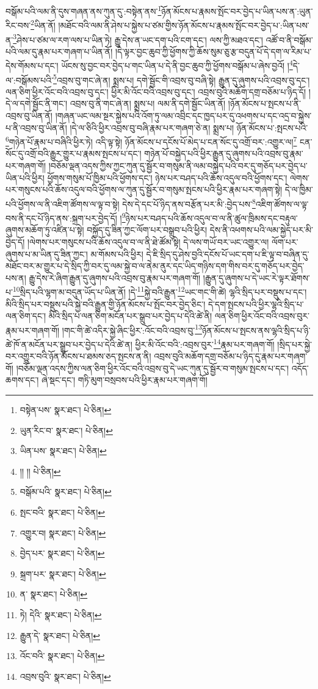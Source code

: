 བསྒོམ་པའི་ལམ་ནི་དུས་གཞན་ནས་ཀུན་དུ་:བསྟེན་ནས་\footnote{བསྟེན་པས་  སྣར་ཐང་།  པེ་ཅིན། }ཉོན་མོངས་པ་རྣམས་སྤོང་བར་བྱེད་པ་ཡིན་པས་ན་:ཡུན་རིང་བས་\footnote{ཡུན་རིང་བ་  སྣར་ཐང་།  པེ་ཅིན། }ཡིན་ནོ། །མཐོང་བའི་ལམ་ནི་ཤེས་པ་སྐྱེས་པ་ཙམ་གྱིས་ཉོན་མོངས་པ་རྣམས་སྤོང་བར་བྱེད་པ་:ཡིན་པས་ན་\footnote{ཡིན་པས་  སྣར་ཐང་།  པེ་ཅིན། }ཤེས་པ་ཙམ་ལ་རག་ལས་པ་ཡིན་ཏེ། རྒྱུ་དེས་ན་ཡང་དག་པའི་ངག་དང་། ལས་ཀྱི་མཐའ་དང་། འཚོ་བ་ནི་བསྒོམ་པའི་ལམ་དུ་རྣམ་པར་གཞག་པ་ཡིན་ནོ། །དེ་ལྟར་བྱང་ཆུབ་ཀྱི་ཕྱོགས་ཀྱི་ཆོས་སུམ་ཅུ་རྩ་བདུན་པོ་དེ་དག་ལ་རིམ་པ་དེས་གོམས་པ་དང་། ཡོངས་སུ་བྱང་བར་བྱེད་པ་གང་ཡིན་པ་དེ་ནི་བྱང་ཆུབ་ཀྱི་ཕྱོགས་བསྒོམ་པ་ཞེས་བྱའོ། །\footnote{།། །།  པེ་ཅིན། }དེ་ལ་:བསྒོམས་པའི་\footnote{བསྒོམ་པའི་  སྣར་ཐང་།  པེ་ཅིན། }འབྲས་བུ་གང་ཞེ་ན། སྨྲས་པ། དགེ་སྦྱོང་གི་འབྲས་བུ་བཞི་སྟེ། རྒྱུན་དུ་ཞུགས་པའི་འབྲས་བུ་དང་། ལན་ཅིག་ཕྱིར་འོང་བའི་འབྲས་བུ་དང་། ཕྱིར་མི་འོང་བའི་འབྲས་བུ་དང་། འབྲས་བུའི་མཆོག་དགྲ་བཅོམ་པ་ཉིད་དོ། །དེ་ལ་དགེ་སྦྱོང་ནི་གང་། འབྲས་བུ་ནི་གང་ཞེ་ན། སྨྲས་པ། ལམ་ནི་དགེ་སྦྱོང་ཡིན་ནོ། །ཉོན་མོངས་པ་སྤངས་པ་ནི་འབྲས་བུ་ཡིན་ནོ། །གཞན་ཡང་ལམ་སྔར་སྐྱེས་པའི་འོག་ཏུ་ལམ་འབྲིང་དང་ཁྱད་པར་དུ་འཕགས་པ་དང་འདྲ་བ་སྐྱེས་པ་ནི་འབྲས་བུ་ཡིན་ནོ། །དེ་ལ་ཅིའི་ཕྱིར་འབྲས་བུ་བཞི་རྣམ་པར་གཞག་ཅེ་ན། སྨྲས་པ། ཉོན་མོངས་པ་:སྤངས་པའི་\footnote{སྤང་བའི་  སྣར་ཐང་།  པེ་ཅིན། }གཉེན་པོ་རྣམ་པ་བཞིའི་ཕྱིར་ཏེ། འདི་ལྟ་སྟེ། ཉོན་མོངས་པ་དངོས་པོ་མེད་པ་ངན་སོང་དུ་འགྲོ་བར་:འགྱུར་ལ།\footnote{འགྱུར་བ།  སྣར་ཐང་།  པེ་ཅིན། } ངན་སོང་དུ་འགྲོ་བའི་རྒྱུར་གྱུར་པ་རྣམས་སྤངས་པ་དང་། གཉེན་པོ་བསྐྱེད་པའི་ཕྱིར་རྒྱུན་དུ་ཞུགས་པའི་འབྲས་བུ་རྣམ་པར་གཞག་གོ། །བཅོམ་ལྡན་འདས་ཀྱིས་ཀྱང་ཀུན་དུ་སྦྱོར་བ་གསུམ་ནི་ལམ་བསྐྱེད་པའི་བར་དུ་གཅོད་པར་བྱེད་པ་ཡིན་པའི་ཕྱིར། ཕྱོགས་གསུམ་པོ་ཁྱིམ་པའི་ཕྱོགས་དང་། ཉེས་པར་བཤད་པའི་ཆོས་འདུལ་བའི་ཕྱོགས་དང་། ལེགས་པར་གསུངས་པའི་ཆོས་འདུལ་བའི་ཕྱོགས་ལ་ཀུན་དུ་སྦྱོར་བ་གསུམ་སྤངས་པའི་ཕྱིར་རྣམ་པར་གཞག་སྟེ། དེ་ལ་ཁྱིམ་པའི་ཕྱོགས་ལ་ནི་འཇིག་ཚོགས་ལ་ལྟ་བ་སྟེ། དེས་དེ་དང་པོ་ཉིད་ནས་བརྩོན་པར་མི་:བྱེད་པས་\footnote{བྱེད་པར་  སྣར་ཐང་།  པེ་ཅིན། }འཇིག་ཚོགས་ལ་ལྟ་བས་ནི་དང་པོ་ཉིད་ནས་:སྐྲག་པར་བྱེད་དོ། །\footnote{སྐྲག་པར་  སྣར་ཐང་།  པེ་ཅིན། }ཉེས་པར་བཤད་པའི་ཆོས་འདུལ་བ་ལ་ནི་ཚུལ་ཁྲིམས་དང་བརྟུལ་ཞུགས་མཆོག་ཏུ་འཛིན་པ་སྟེ། བསྐྱོད་དུ་ཟིན་ཀྱང་ལོག་པར་བསྒྲུབ་པའི་ཕྱིར། དེས་ནི་འཕགས་པའི་ལམ་སྐྱེད་པར་མི་བྱེད་དོ། །ལེགས་པར་གསུངས་པའི་ཆོས་འདུལ་བ་ལ་ནི་ཐེ་ཚོམ་སྟེ། དེ་ལས་གཡོ་བར་ཡང་འགྱུར་ལ། ལོག་པར་ཞུགས་པ་མ་ཡིན་དུ་ཟིན་ཀྱང་། མ་གོམས་པའི་ཕྱིར། དེ་ཇི་སྲིད་དུ་ཤེས་བྱའི་དངོས་པོ་ཡང་དག་པ་ཇི་ལྟ་བ་བཞིན་དུ་མཐོང་བར་མ་གྱུར་པ་དེ་སྲིད་ཀྱི་བར་དུ་ལམ་སྐྱེ་བ་ལ་ནེམ་ནུར་དང་ཡིད་གཉིས་དག་གིས་བར་དུ་གཅོད་པར་བྱེད་པས་ན། རྒྱུ་དེས་རེ་ཞིག་རྒྱུན་དུ་ཞུགས་པའི་འབྲས་བུ་རྣམ་པར་གཞག་གོ། །རྒྱུན་དུ་ཞུགས་པ་དེ་ཡང་རེ་ལྟར་ཐོགས་པ་\footnote{ན་  སྣར་ཐང་།  པེ་ཅིན། }སྲིད་པའི་ལྷག་མ་བདུན་ཡོད་པ་ཡིན་ནོ། །དེ་\footnote{ཏེ། དེའི་  སྣར་ཐང་།  པེ་ཅིན། }སྐྱེ་བའི་རྒྱུན་\footnote{རྒྱུན་དེ་  སྣར་ཐང་།  པེ་ཅིན། }ཡང་གང་གི་ཚེ། ལྷའི་སྲིད་པར་བསྡུས་པ་དང་། མིའི་སྲིད་པར་བསྡུས་པའི་སྐྱེ་བའི་རྒྱུན་གྱི་ཉོན་མོངས་པ་སྤོང་བར་བྱེད་ཅིང་། དེ་དག་སྤངས་པའི་ཕྱིར་ལྷའི་སྲིད་པ་ལན་ཅིག་དང་། མིའི་སྲིད་པ་ལན་ཅིག་མངོན་པར་སྒྲུབ་པར་བྱེད་པ་དེའི་ཚེ་ནི། ལན་ཅིག་ཕྱིར་འོང་བའི་འབྲས་བུར་རྣམ་པར་གཞག་གོ། །གང་གི་ཚེ་འདིར་སྐྱེ་ཞིང་ཕྱིར་:འོང་བའི་འབྲས་བུ་\footnote{འོང་བའི་  སྣར་ཐང་།  པེ་ཅིན། }ཉོན་མོངས་པ་སྤངས་ནས་ལྷའི་སྲིད་པ་ཉི་ཚེ་ཁོ་ན་མངོན་པར་སྒྲུབ་པར་བྱེད་པ་དེའི་ཚེ་ན། ཕྱིར་མི་འོང་བའི་:འབྲས་བུར་\footnote{འབྲས་བུའི་  སྣར་ཐང་།  པེ་ཅིན། }རྣམ་པར་གཞག་གོ། །སྲིད་པར་སྐྱེ་བར་འགྱུར་བའི་ཉོན་མོངས་པ་ཐམས་ཅད་སྤངས་ན་ནི། འབྲས་བུའི་མཆོག་དགྲ་བཅོམ་པ་ཉིད་དུ་རྣམ་པར་གཞག་གོ། །བཅོམ་ལྡན་འདས་ཀྱིས་ལན་ཅིག་ཕྱིར་འོང་བའི་འབྲས་བུ་དེ་ཡང་ཀུན་དུ་སྦྱོར་བ་གསུམ་སྤངས་པ་དང་། འདོད་ཆགས་དང་། ཞེ་སྡང་དང་། གཏི་མུག་བསྲབས་པའི་ཕྱིར་རྣམ་པར་གཞག་གོ། 